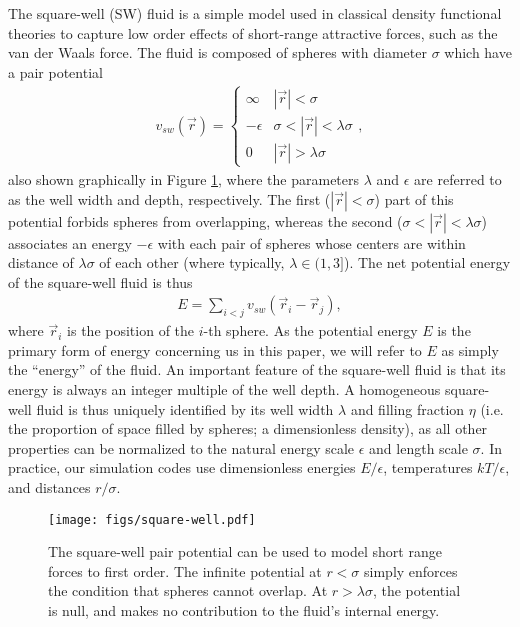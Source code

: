 \documentclass[11pt]{article}
\newcommand{\p}[1]{\left(#1\right)} %
\begin{document}
The square-well (SW) fluid is a simple model used in classical density
functional theories to capture low order effects of short-range
attractive forces, such as the van der Waals force. The fluid is
composed of spheres with diameter $\sigma$ which have a pair potential
\newcommand\abs[1]{\left|#1\right|}
\begin{align}
  v_{sw}\p{\vec r}=\left\{
    \begin{array}{ll}
      \infty & \abs{\vec r}<\sigma \\
      -\epsilon & \sigma<\abs{\vec r}<\lambda\sigma \\
      0 & \abs{\vec r}>\lambda\sigma
    \end{array}
  \right., \label{eq:pair_potential}
\end{align}
also shown graphically in Figure \ref{fig:pair_potential}, where the
parameters $\lambda$ and $\epsilon$ are referred to as the well width
and depth, respectively. The first ($\abs{\vec r}<\sigma$) part of
this potential forbids spheres from overlapping, whereas the second
($\sigma<\abs{\vec r}<\lambda\sigma$) associates an energy $-\epsilon$
with each pair of spheres whose centers are within distance of
$\lambda\sigma$ of each other (where typically, $\lambda\in(1,3]$).
The net potential energy of the square-well fluid is thus
\begin{align}
  E=\sum_{i<j}v_{sw}\p{\vec r_i-\vec r_j},
  \label{eq:internal_energy}
\end{align}
where $\vec r_i$ is the position of the $i$-th sphere. As the
potential energy $E$ is the primary form of energy concerning us in
this paper, we will refer to $E$ as simply the ``energy'' of the
fluid. An important feature of the square-well fluid is that its
energy is always an integer multiple of the well depth. A homogeneous
square-well fluid is thus uniquely identified by its well width
$\lambda$ and filling fraction $\eta$ (i.e. the proportion of space
filled by spheres; a dimensionless density), as all other properties
can be normalized to the natural energy scale $\epsilon$ and length
scale $\sigma$. In practice, our simulation codes use dimensionless
energies $E/\epsilon$, temperatures $kT/\epsilon$, and distances
$r/\sigma$.

\begin{figure}[!b]
  \centering
  \texttt{[image: figs/square-well.pdf]}
  \caption[The square-well pair potential]
  {The square-well pair potential can be used to model short range
    forces to first order. The infinite potential at $r<\sigma$ simply
    enforces the condition that spheres cannot overlap. At
    $r>\lambda\sigma$, the potential is null, and makes no
    contribution to the fluid's internal energy.}
  \label{fig:pair_potential}
\end{figure}
\end{document}
